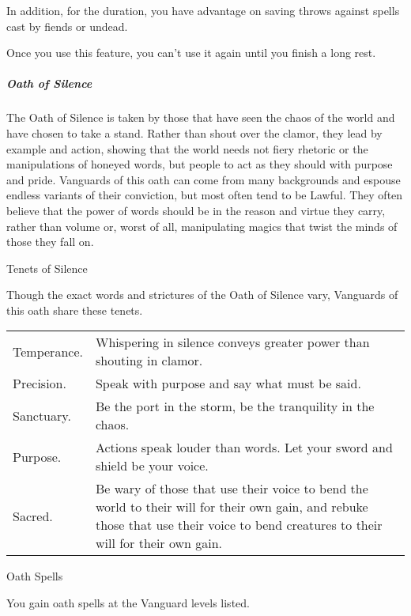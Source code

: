 In addition, for the duration, you have advantage on saving throws
against spells cast by fiends or undead.

Once you use this feature, you can't use it again until you finish a
long rest.

\subparagraph{Oath of Silence}\label{_oath_of_silence}

The Oath of Silence is taken by those that have seen the chaos of the
world and have chosen to take a stand. Rather than shout over the
clamor, they lead by example and action, showing that the world needs
not fiery rhetoric or the manipulations of honeyed words, but people to
act as they should with purpose and pride. Vanguards of this oath can
come from many backgrounds and espouse endless variants of their
conviction, but most often tend to be Lawful. They often believe that
the power of words should be in the reason and virtue they carry, rather
than volume or, worst of all, manipulating magics that twist the minds
of those they fall on.

Tenets of Silence

Though the exact words and strictures of the Oath of Silence vary,
Vanguards of this oath share these tenets.

\begin{longtable}[]{@{}
  >{\raggedright\arraybackslash}p{}
  >{\raggedright\arraybackslash}p{}@{}}
\toprule\noalign{}
\endhead
\bottomrule\noalign{}
\endlastfoot
Temperance. & Whispering in silence conveys greater power than shouting
in clamor. \\
Precision. & Speak with purpose and say what must be said. \\
Sanctuary. & Be the port in the storm, be the tranquility in the
chaos. \\
Purpose. & Actions speak louder than words. Let your sword and shield be
your voice. \\
Sacred. & Be wary of those that use their voice to bend the world to
their will for their own gain, and rebuke those that use their voice to
bend creatures to their will for their own gain. \\
\end{longtable}

Oath Spells

You gain oath spells at the Vanguard levels listed.


